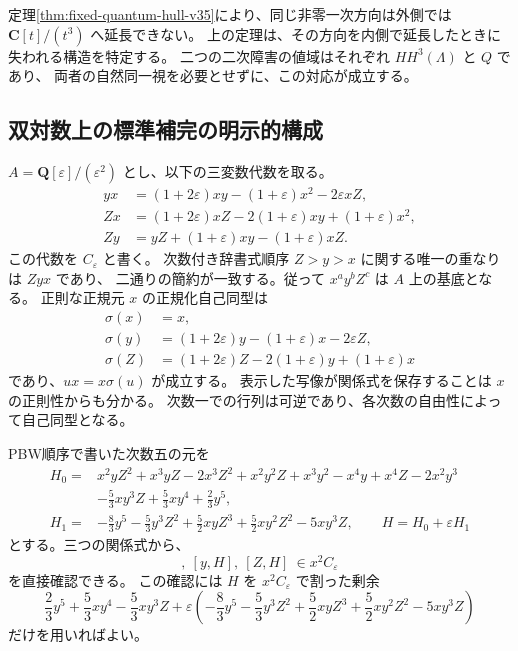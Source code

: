 定理\ref{thm:fixed-quantum-hull-v35}により、同じ非零一次方向は外側では
$\mathbf C[t]/(t^3)$ へ延長できない。
上の定理は、その方向を内側で延長したときに失われる構造を特定する。
二つの二次障害の値域はそれぞれ $HH^3(\Lambda)$ と $Q$ であり、
両者の自然同一視を必要とせずに、この対応が成立する。

\subsection{双対数上の標準補完の明示的構成}

$A=\mathbf Q[\varepsilon]/(\varepsilon^2)$ とし、以下の三変数代数を取る。
\begin{equation}
\begin{aligned}
 yx&=(1+2\varepsilon)xy-(1+\varepsilon)x^2-2\varepsilon xZ,\\
 Zx&=(1+2\varepsilon)xZ-2(1+\varepsilon)xy+(1+\varepsilon)x^2,\\
 Zy&=yZ+(1+\varepsilon)xy-(1+\varepsilon)xZ.
\end{aligned}
\label{eq:completion-base-relations-v38}
\end{equation}
この代数を $C_\varepsilon$ と書く。
次数付き辞書式順序 $Z>y>x$ に関する唯一の重なりは $Zyx$ であり、
二通りの簡約が一致する。従って $x^a y^bZ^c$ は $A$ 上の基底となる。
正則な正規元 $x$ の正規化自己同型は
\begin{equation}
\begin{aligned}
 \sigma(x)&=x,\\
 \sigma(y)&=(1+2\varepsilon)y-(1+\varepsilon)x-2\varepsilon Z,\\
 \sigma(Z)&=(1+2\varepsilon)Z-2(1+\varepsilon)y+(1+\varepsilon)x
\end{aligned}
\label{eq:completion-sigma-v38}
\end{equation}
であり、$ux=x\sigma(u)$ が成立する。
表示した写像が関係式を保存することは $x$ の正則性からも分かる。
次数一での行列は可逆であり、各次数の自由性によって自己同型となる。

PBW順序で書いた次数五の元を
\begin{equation}
\begin{aligned}
 H_0={}&x^2yZ^2+x^3yZ-2x^3Z^2+x^2y^2Z+x^3y^2
              -x^4y+x^4Z-2x^2y^3\\
      &-\frac53xy^3Z+\frac53xy^4+\frac23y^5,\\
 H_1={}&-\frac83y^5-\frac53y^3Z^2
       +\frac52xyZ^3+\frac52xy^2Z^2-5xy^3Z,
 \qquad H=H_0+\varepsilon H_1
\end{aligned}
\label{eq:completion-H-v38}
\end{equation}
とする。三つの関係式から、
\begin{equation}
 [x,H],\ [y,H],\ [Z,H]\ \in x^2 C_\varepsilon
 \label{eq:completion-divisibility-v38}
\end{equation}
を直接確認できる。
この確認には $H$ を $x^2C_\varepsilon$ で割った剰余
\[
 \frac23y^5+\frac53xy^4-\frac53xy^3Z
 +\varepsilon\left(-\frac83y^5-\frac53y^3Z^2
       +\frac52xyZ^3+\frac52xy^2Z^2-5xy^3Z\right)
\]
だけを用いればよい。

